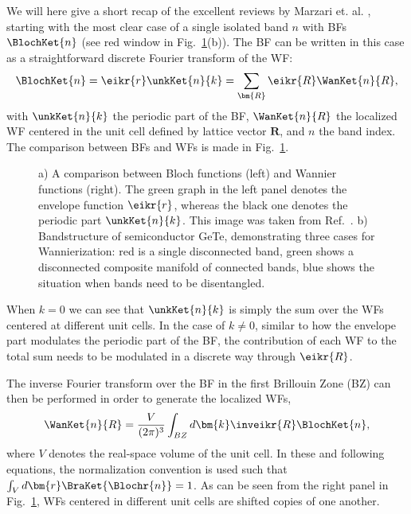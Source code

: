 We will here give a short recap of the excellent reviews by Marzari et. al. \cite{Marzari2003,Marzari2012}, starting with the most clear case of a single isolated band $n$ with BFs $\BlochKet{n}$ (see red window in Fig.~\ref{fig:Theory_blochvswan}(b)).
The BF can be written in this case as a straightforward discrete Fourier transform of the WF: 
\begin{equation}
	\label{eq:Theory_1bandwan}
	\BlochKet{n} = \eikr{r} \unkKet{n}{k} = \sum_{\bm{R}} \eikr{R} \WanKet{n}{R},
\end{equation}
with $\unkKet{n}{k}$ the periodic part of the BF, $\WanKet{n}{R}$ the localized WF centered in the unit cell defined by lattice vector $\bm{R}$, and $n$ the band index.
The comparison between BFs and WFs is made in Fig.~\ref{fig:Theory_blochvswan}.
\begin{figure}
	\caption{\label{fig:Theory_blochvswan} a) A comparison between Bloch functions (left) and Wannier functions (right). The green graph in the left panel denotes the envelope function $\eikr{r}$, whereas the black one denotes the periodic part $\unkKet{n}{k}$. This image was taken from Ref.~\cite{Marzari2012}. b) Bandstructure of semiconductor GeTe, demonstrating three cases for Wannierization: red is a single disconnected band, green shows a disconnected composite manifold of connected bands, blue shows the situation when bands need to be disentangled.}
\end{figure}
When $k=0$ we can see that $\unkKet{n}{k}$ is simply the sum over the WFs centered at different unit cells.
In the case of $k \neq 0$, similar to how the envelope part modulates the periodic part of the BF, the contribution of each WF to the total sum needs to be modulated in a discrete way through $\eikr{R}$.

The inverse Fourier transform over the BF in the first Brillouin Zone (BZ) can then be performed in order to generate the localized WFs,
\begin{equation}
	\label{eq:Theory_wanfourier}
	\WanKet{n}{R} = \frac{V}{(2\pi)^3} \int_{BZ} d \bm{k} \inveikr{R} \BlochKet{n},
\end{equation}
where $V$ denotes the real-space volume of the unit cell.
In these and following equations, the normalization convention is used such that $\int_V d\bm{r}\BraKet{\Blochr{n}} = 1$.
As can be seen from the right panel in Fig.~\ref{fig:Theory_blochvswan}, WFs centered in different unit cells are shifted copies of one another.

